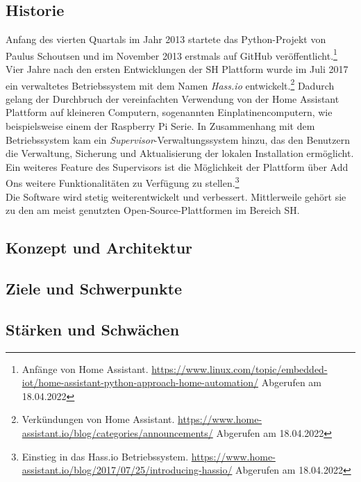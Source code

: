     \subsection*{Historie}
    \label{sec:historyHOAS}
        Anfang des vierten Quartals im Jahr 2013 startete das Python-Projekt von Paulus Schoutsen und im November 2013 erstmals auf GitHub 
        veröffentlicht.\footnote{Anfänge von Home Assistant. \url{https://www.linux.com/topic/embedded-iot/home-assistant-python-approach-home-automation/} Abgerufen am 18.04.2022}
        \\
        \linebreak
        Vier Jahre nach den ersten Entwicklungen der \acl{SH} Plattform wurde im Juli 2017 ein verwaltetes Betriebssystem mit dem Namen 
        \textit{Hass.io} entwickelt.\footnote{Verkündungen von Home Assistant. \url{https://www.home-assistant.io/blog/categories/announcements/} Abgerufen am 18.04.2022} 
        Dadurch gelang der Durchbruch der vereinfachten Verwendung von der Home Assistant Plattform auf kleineren Computern, sogenannten 
        Einplatinencomputern, wie beispielsweise einem der Raspberry Pi Serie. In Zusammenhang mit dem Betriebssystem kam ein 
        \textit{Supervisor}-Verwaltungssystem hinzu, das den Benutzern die Verwaltung, Sicherung und Aktualisierung der lokalen Installation 
        ermöglicht. Ein weiteres Feature des Supervisors ist die Möglichkeit der Plattform über Add Ons weitere Funktionalitäten zu Verfügung zu 
        stellen.\footnote{Einstieg in das Hass.io Betriebssystem. \url{https://www.home-assistant.io/blog/2017/07/25/introducing-hassio/} Abgerufen am 18.04.2022}
        \\
        \linebreak
        Die Software wird stetig weiterentwickelt und verbessert. Mittlerweile gehört sie zu den am meist genutzten Open-Source-Plattformen 
        im Bereich \acl{SH}.
        

\subsection{Konzept und Architektur}
\label{sec:conceptArchitectureHAOS}
\subsection{Ziele und Schwerpunkte}
\subsection{Stärken und Schwächen}
